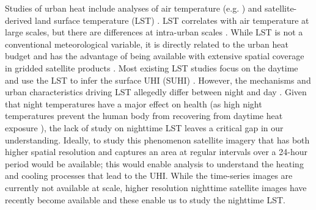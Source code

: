 \documentclass[final,3p,times,onecolumn,sort&compress]{elsarticle}
\begin{document}
Studies of urban heat include analyses of air temperature (e.g. \cite{Scott2016-lc}) and satellite-derived land surface temperature (LST) \citep{Imhoff2010-lf, Peng2012-iy, Peng2018-cp, Zhou2014-wc, Voogt2003-mm}.
LST correlates with air temperature at large scales, but there are differences at intra-urban scales \citep{Good2016-yk}.
While LST is not a conventional meteorological variable, it is directly related to the urban heat budget and has the advantage of being available with extensive spatial coverage in gridded satellite products \citep{Hung2006-qy}.
Most existing LST studies focus on the daytime \citep{Peng2018-cp,Chun2018-so,Wang2019-water,Zhou2018-iy} and use the LST to infer the surface UHI (SUHI) \cite{Zhou2018-iy}.
However, the mechanisms and urban characteristics driving LST allegedly differ between night and day \citep{Hung2006-qy, Chun2017-mm, Nichol2005-mm, Wicki2017-fv, Echevarria_Icaza2016-fr,Sobstyl2018-wt, Peng2012-iy, Zhou2014-wc, Zhao2017-cc}. 
Given that night temperatures have a major effect on health (as high night temperatures prevent the human body from recovering from daytime heat exposure \cite{Laaidi2012-ir}), the lack of study on nighttime LST leaves a critical gap in our understanding. 
Ideally, to study this phenomenon satellite imagery that has both higher spatial resolution and captures an area at regular intervals over a 24-hour period would be available; this would enable analysis to understand the heating and cooling processes that lead to the UHI.
While the time-series images are currently not available at scale, higher resolution nighttime satellite images have recently become available and these enable us to study the nighttime LST.
\end{document}
